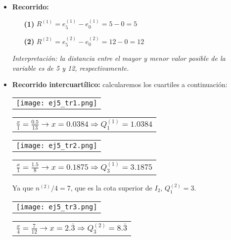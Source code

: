 \documentclass[11pt,a4paper]{article}
\theoremstyle{definition}
\begin{document}
\begin{itemize}
\begin{itemize}
		\item \textbf{Recorrido:}
		\begin{itemize}
			\item[\textbf{(1)}] $R^{(1)} = e_5^{(1)} - e_0^{(1)} = 5 - 0 = 5$
			\item[\textbf{(2)}] $R^{(2)} = e_5^{(2)} - e_0^{(2)} = 12 - 0 = 12$
		\end{itemize}
		\emph{Interpretación: la distancia entre el mayor y menor valor posible de la variable es de 5 y 12, respectivamente.}
		\item \textbf{Recorrido intercuartílico:} calcularemos los cuartiles a continuación: 


	\begin{table}[!htbp]
\hspace*{1.1 cm}
\begin{tabular}{c}
\texttt{[image: ej5\_tr1.png]} \\
\end{tabular}
{
\begin{tabular}{l}
$ \frac{x}{1}=\frac{0.5}{13} \rightarrow x = 0.0384 \Rightarrow Q_{1}^{(1)}= 1.0384 $
\end{tabular}}

\hspace*{1.1 cm}
\begin{tabular}{c}
\texttt{[image: ej5\_tr2.png]} \\
\end{tabular}
{
\begin{tabular}{l}
$ \frac{x}{1}=\frac{1.5}{8} \rightarrow x = 0.1875 \Rightarrow Q_{3}^{(1)}= 3.1875 $
\end{tabular}}

\end{table}

Ya que $n^{(2)} / 4 = 7$, que es la cota superior de $I_2$, $Q_{1}^{(2)}= 3$.

\begin{table}[!htbp]
\hspace*{1.1 cm}
\begin{tabular}{c}
\texttt{[image: ej5\_tr3.png]} \\
\end{tabular}
{
\begin{tabular}{l}
$ \frac{x}{4}=\frac{7}{12} \rightarrow x = 2.\bar{3} \Rightarrow Q_{3}^{(2)}= 8.\bar{3} $
\end{tabular}}

\end{table}
			

\end{itemize}
\end{itemize}
\end{document}
